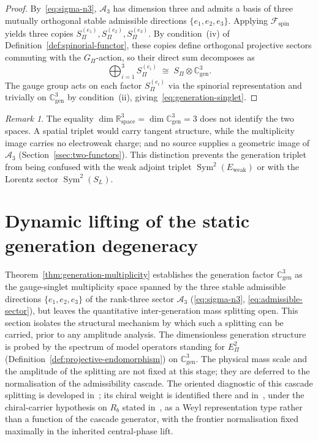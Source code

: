\documentclass[11pt,a4paper]{article}
\theoremstyle{definition}
\theoremstyle{remark}
\newtheorem{remark}[theorem]{Remark}
\begin{document}
    \begin{proof}
      By~\eqref{eq:sigma-n3}, $\mathcal{A}_3$ has dimension three and admits a basis of
      three mutually orthogonal stable admissible directions $\{e_1, e_2, e_3\}$.
      Applying $\mathcal{F}_{\mathrm{spin}}$ yields three copies
      $S_\Pi^{(e_1)}, S_\Pi^{(e_2)}, S_\Pi^{(e_3)}$.
      By condition~(iv) of Definition~\ref{def:spinorial-functor}, these copies define
      orthogonal projective sectors commuting with the $G_\Pi$-action, so their direct
      sum decomposes as
      \[
        \bigoplus_{i=1}^{3} S_\Pi^{(e_i)} \;\cong\; S_\Pi \otimes \mathbb{C}^3_{\mathrm{gen}}.
      \]
      The gauge group acts on each factor $S_\Pi^{(e_i)}$ via the spinorial
      representation and trivially on $\mathbb{C}^3_{\mathrm{gen}}$ by condition~(ii),
      giving~\eqref{eq:generation-singlet}.
    \end{proof}

    \begin{remark}
      \label{rem:space-generation-distinction}
      The equality $\dim \mathbb{R}^3_{\mathrm{space}} = \dim \mathbb{C}^3_{\mathrm{gen}} = 3$
      does not identify the two spaces.
      A spatial triplet would carry tangent structure, while the multiplicity image carries no
      electroweak charge; and no source supplies a geometric image of $\mathcal{A}_3$
      (Section~\ref{ssec:two-functors}).
      This distinction prevents the generation triplet from being confused with the
      weak adjoint triplet $\operatorname{Sym}^2(E_{\mathrm{weak}})$ or with the Lorentz sector
      $\operatorname{Sym}^2(S_L)$.
    \end{remark}

  \section{Dynamic lifting of the static generation degeneracy}
  \label{sec:dyn-lift}

  Theorem~\ref{thm:generation-multiplicity} establishes the generation factor
  $\mathbb{C}^3_{\mathrm{gen}}$ as the gauge-singlet multiplicity space spanned by the three stable
  admissible directions $\{e_1, e_2, e_3\}$ of the rank-three sector $\mathcal{A}_3$
  (\eqref{eq:sigma-n3}, \eqref{eq:admissible-sector}), but leaves the quantitative
  inter-generation mass splitting open.
  This section isolates the structural mechanism by which such a splitting can be carried, prior to
  any amplitude analysis.
  The dimensionless generation structure is probed by the spectrum of model operators standing for
  $E_\Pi^2$ (Definition~\ref{def:projective-endomorphism}) on $\mathbb{C}^3_{\mathrm{gen}}$.
  The physical mass scale and the amplitude of the splitting are not fixed at this stage; they are
  deferred to the normalisation of the admissibility cascade.
  The oriented diagnostic of this cascade splitting is developed in~\cite{Beau2026q11of}; its chiral weight is
  identified there and in~\cite{Beau2026cho}, under the chiral-carrier hypothesis on $R_b$ stated in~\cite{Beau2026q11of},
  as a Weyl representation type rather than a function of the cascade generator, with the frontier normalisation fixed maximally in the inherited central-phase lift.
\end{document}

